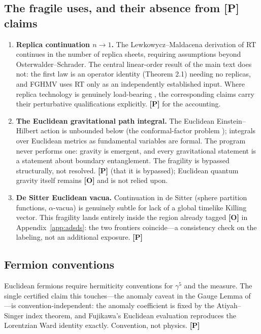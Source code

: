 \documentclass[11pt]{article}
\theoremstyle{definition}
\newcommand{\pP}{\textbf{[P]}}
\newcommand{\pO}{\textbf{[O]}}
\begin{document}
\subsection{The fragile uses, and their absence from \pP{} claims}

\begin{enumerate}[itemsep=2pt]
\item \textbf{Replica continuation $n\to1$.} The Lewkowycz--Maldacena
derivation of RT \cite{LM2013} continues in the number of replica sheets,
requiring assumptions beyond Osterwalder--Schrader. The central
linear-order result of the main text does not: the first law is an
operator identity (Theorem 2.1) needing no replicas, and FGHMV
\cite{Faulkner2014} uses RT only as an independently established input.
Where replica technology is genuinely load-bearing
\cite{FLM2013,EngelhardtWall2015}, the corresponding claims carry their
perturbative qualifications explicitly. \pP{} for the accounting.
\item \textbf{The Euclidean gravitational path integral.} The Euclidean
Einstein--Hilbert action is unbounded below (the conformal-factor problem
\cite{GHP1978}); integrals over Euclidean metrics as fundamental variables
are formal. The program never performs one: gravity is emergent, and every
gravitational statement is a statement about boundary entanglement. The
fragility is bypassed structurally, not resolved. \pP{} (that it is
bypassed); Euclidean quantum gravity itself remains \pO{} and is not
relied upon.
\item \textbf{De Sitter Euclidean vacua.} Continuation in de Sitter
(sphere partition functions, $\alpha$-vacua) is genuinely subtle for lack
of a global timelike Killing vector. This fragility lands entirely inside
the region already tagged \pO{} in Appendix~\ref{app:adsds}: the two
frontiers coincide---a consistency check on the labeling, not an
additional exposure. \pP{}
\end{enumerate}

\subsection{Fermion conventions}

Euclidean fermions require hermiticity conventions for $\gamma^5$ and the
measure. The single certified claim this touches---the anomaly caveat in
the Gauge Lemma of \cite{McGwier2026b}---is convention-independent: the
anomaly coefficient is fixed by the Atiyah--Singer index theorem, and
Fujikawa's Euclidean evaluation \cite{Fujikawa1979} reproduces the
Lorentzian Ward identity exactly. Convention, not physics. \pP{}
\end{document}
